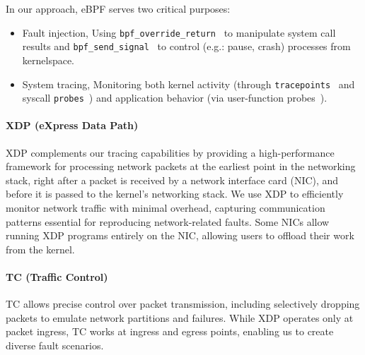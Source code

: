 In our approach, eBPF serves two critical purposes:
\begin{itemize}[leftmargin=*]
\item Fault injection, Using \texttt{bpf\_override\_return}~\cite{override} to manipulate system call results and \texttt{bpf\_send\_signal}~\cite{send_signal} to control (e.g.: pause, crash) processes from kernelspace.
\item System tracing, Monitoring both kernel activity (through \texttt{tracepoints}~\cite{ebpftracepoints} and syscall \texttt{probes}~\cite{ksyscall}) and application behavior (via user-function probes~\cite{ebpfuprobes}).
\end{itemize}

\paragraph{XDP (eXpress Data Path)} XDP complements our tracing capabilities by providing a high-performance framework for processing network packets at the earliest point in the networking stack, right after a packet is received by a network interface card (NIC), and before it is passed to the kernel's networking stack.
We use XDP to efficiently monitor network traffic with minimal overhead, capturing communication patterns essential for reproducing network-related faults.
Some NICs allow running XDP programs entirely on the NIC, allowing users to offload their work from the kernel.


\paragraph{TC (Traffic Control)} TC allows precise control over packet transmission, including selectively dropping packets to emulate network partitions and failures.
While XDP  operates only at packet ingress, TC works at ingress and egress points, enabling us to create diverse fault scenarios.

